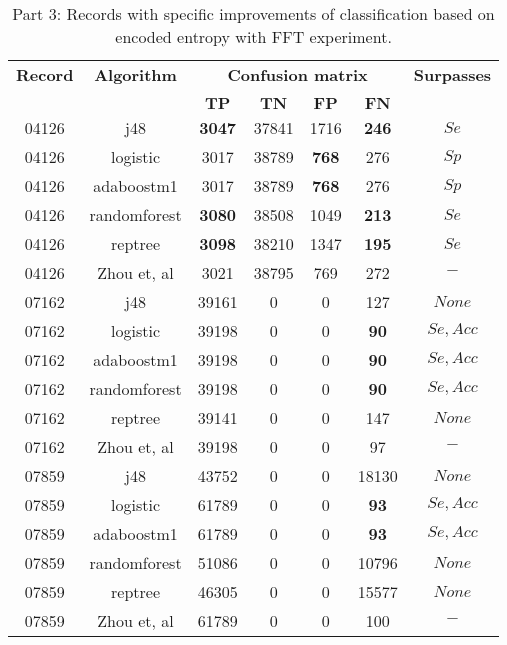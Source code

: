 \begin{table}[h]
\begin{center}
\begin{threeparttable}
\caption{Part 3: Records with specific improvements of classification based on encoded entropy with FFT experiment.}
\label{table:encoded_fft_3}
\scriptsize
  \begin{tabular}{c c c c c c c}
  \toprule
  \textbf{Record} & \textbf{Algorithm} & \multicolumn{4}{c}{\textbf{Confusion matrix}} & \textbf{Surpasses}\\
  \cline{3-6}
  \\
  & & $\mathbf{TP}$ & $\mathbf{TN}$ & $\mathbf{FP}$ & $\mathbf{FN}$\\
  \midrule  
 04126 & j48 & \textbf{3047} & 37841 & 1716 & \textbf{246} & $Se$ \\
    04126 & logistic & 3017 & 38789 & \textbf{768} & 276 & $Sp$ \\
    04126 & adaboostm1 & 3017 & 38789 & \textbf{768} & 276 & $Sp$ \\
    04126 & randomforest & \textbf{3080} & 38508 & 1049 & \textbf{213} & $Se$ \\
    04126 & reptree & \textbf{3098} & 38210 & 1347 & \textbf{195} & $Se$ \\
    04126 & Zhou et, al & 3021 & 38795 & 769 & 272 & $-$ \\
    \hline
    07162 & j48 & 39161 & 0 & 0 & 127 & $None$ \\
    07162 & logistic & 39198 & 0 & 0 & \textbf{90} & $Se, Acc$ \\
    07162 & adaboostm1 & 39198 & 0 & 0 & \textbf{90} & $Se, Acc$ \\
    07162 & randomforest & 39198 & 0 & 0 & \textbf{90} & $Se, Acc$ \\
    07162 & reptree & 39141 & 0 & 0 & 147 & $None$ \\
    07162 & Zhou et, al & 39198 & 0 & 0 & 97 & $-$ \\
    \hline
    07859 & j48 & 43752 & 0 & 0 & 18130 & $None$ \\
    07859 & logistic & 61789 & 0 & 0 & \textbf{93} & $Se, Acc$ \\
    07859 & adaboostm1 & 61789 & 0 & 0 & \textbf{93} & $Se, Acc$ \\
    07859 & randomforest & 51086 & 0 & 0 & 10796 & $None$ \\
    07859 & reptree & 46305 & 0 & 0 & 15577 & $None$ \\
    07859 & Zhou et, al & 61789 & 0 & 0 & 100 & $-$ \\

\end{tabular}
\end{threeparttable}
\end{center}
\end{table}
